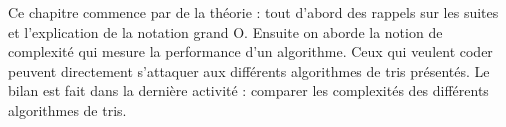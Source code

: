 \documentclass[11pt,class=report,crop=false]{standalone}
\begin{document}



\bigskip

Ce chapitre commence par de la théorie : tout d'abord des rappels sur les suites et l'explication de la notation \og{}grand O\fg{}. Ensuite on aborde la notion de complexité qui mesure la performance d'un algorithme. Ceux qui veulent coder peuvent directement s'attaquer aux différents algorithmes de tris présentés. Le bilan est fait dans la dernière activité : comparer les complexités des différents algorithmes de tris.

\bigskip

\end{document}

